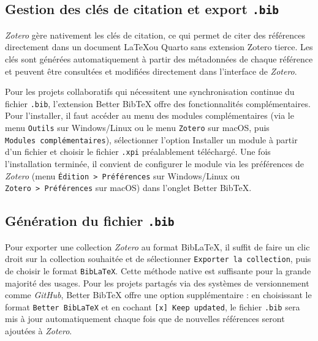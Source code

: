 \documentclass[
  letterpaper,
  DIV=11,
  numbers=noendperiod,
  oneside]{scrreprt}
\begin{document}
\hypertarget{gestion-des-cluxe9s-de-citation-et-export-.bib}{%
\subsection{\texorpdfstring{Gestion des clés de citation et export
\texttt{.bib}}{Gestion des clés de citation et export .bib}}\label{gestion-des-cluxe9s-de-citation-et-export-.bib}}

\emph{Zotero} gère nativement les clés de citation, ce qui permet de
citer des références directement dans un document \LaTeX ou Quarto sans
extension Zotero tierce. Les clés sont générées automatiquement à partir
des métadonnées de chaque référence et peuvent être consultées et
modifiées directement dans l'interface de \emph{Zotero}.

Pour les projets collaboratifs qui nécessitent une synchronisation
continue du fichier \texttt{.bib}, l'extension Better BibTeX offre des
fonctionnalités complémentaires. Pour l'installer, il faut accéder au
menu des modules complémentaires (via le menu \texttt{Outils} sur
Windows/Linux ou le menu \texttt{Zotero} sur macOS, puis
\texttt{Modules\ complémentaires}), sélectionner l'option Installer un
module à partir d'un fichier et choisir le fichier \texttt{.xpi}
préalablement téléchargé. Une fois l'installation terminée, il convient
de configurer le module via les préférences de \emph{Zotero} (menu
\texttt{Édition\ \textgreater{}\ Préférences} sur Windows/Linux ou
\texttt{Zotero\ \textgreater{}\ Préférences} sur macOS) dans l'onglet
Better BibTeX.

\hypertarget{guxe9nuxe9ration-du-fichier-.bib}{%
\subsection{\texorpdfstring{Génération du fichier
\texttt{.bib}}{Génération du fichier .bib}}\label{guxe9nuxe9ration-du-fichier-.bib}}

Pour exporter une collection \emph{Zotero} au format BibLaTeX, il suffit
de faire un clic droit sur la collection souhaitée et de sélectionner
\texttt{Exporter\ la\ collection}, puis de choisir le format
\texttt{BibLaTeX}. Cette méthode native est suffisante pour la grande
majorité des usages. Pour les projets partagés via des systèmes de
versionnement comme \emph{GitHub}, Better BibTeX offre une option
supplémentaire : en choisissant le format \texttt{Better\ BibLaTeX} et
en cochant \texttt{{[}x{]}\ Keep\ updated}, le fichier \texttt{.bib}
sera mis à jour automatiquement chaque fois que de nouvelles références
seront ajoutées à \emph{Zotero}.
\end{document}
